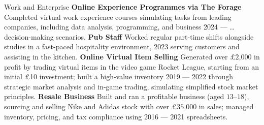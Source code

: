 \begin{rubric}{Work and Enterprise}
\entry*[]%
  \textbf{Online Experience Programmes via The Forage} 
  Completed virtual work experience courses \newline simulating tasks from leading companies, including data analysis, programming, and business \hfill 2024 — \dots \newline decision-making scenarios.
\entry*[]
\textbf{Pub Staff}
Worked regular part-time shifts alongside studies in a fast-paced hospitality environment, \hfill 2023 \newline serving customers and assisting in the kitchen.
\entry*[]%
	\textbf{Online Virtual Item Selling} Generated over £$2$,$000$ in profit by trading virtual items in the video \newline game Rocket League, starting from an initial £10 investment; built a high-value inventory \hfill 2019 — 2022 \newline through strategic market analysis and in-game trading, simulating simplified stock market principles.
\entry*[]%
	\textbf{Resale Business} Built and ran a profitable business (aged $13$–$18$), sourcing and selling Nike and \newline Adidas stock with over £$35$,$000$ in sales; managed inventory, pricing, and tax compliance using \hfill 2016 — 2021 \newline spreadsheets.
\end{rubric}